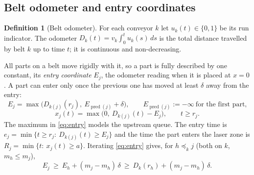 \documentclass[11pt,a4paper]{article}
\theoremstyle{plain}
\theoremstyle{definition}
\newtheorem{definition}{Definition}
\theoremstyle{remark}
\newcommand{\pred}{\operatorname{pred}}
\begin{document}
\subsection{Belt odometer and entry coordinates}
\begin{definition}[Belt odometer]
For each conveyor $k$ let $u_k(t)\in\{0,1\}$ be its run indicator. The odometer
$D_k(t)=v_k\int_0^t u_k(s)\,ds$ is the total distance travelled by belt $k$ up to time
$t$; it is continuous and non-decreasing.
\end{definition}
All parts on a belt move rigidly with it, so a part is fully described by one constant,
its \emph{entry coordinate} $E_j$, the odometer reading when it is placed at $x=0$. A part
can enter only once the previous one has moved at least $\delta$ away from the entry:
\begin{equation}\label{eq:entry}
E_j=\max\bigl(D_{k(j)}(r_j),\ E_{\pred(j)}+\delta\bigr),\qquad E_{\pred(j)}:=-\infty\ \text{for the first part,}
\end{equation}
\begin{equation}\label{eq:pos}
x_j(t)=\max\bigl(0,\ D_{k(j)}(t)-E_j\bigr),\qquad t\ge r_j .
\end{equation}
The maximum in \eqref{eq:entry} models the upstream queue. The entry time is
$e_j=\min\{t\ge r_j:\ D_{k(j)}(t)\ge E_j\}$ and the time the part enters the laser zone is
$R_j=\min\{t:\ x_j(t)\ge a\}$. Iterating \eqref{eq:entry} gives, for $h\preceq_k j$ (both on
$k$, $m_h\le m_j$),
\begin{equation}\label{eq:iter}
E_j\ \ge\ E_h+(m_j-m_h)\,\delta\ \ge\ D_k(r_h)+(m_j-m_h)\,\delta .
\end{equation}
\end{document}

